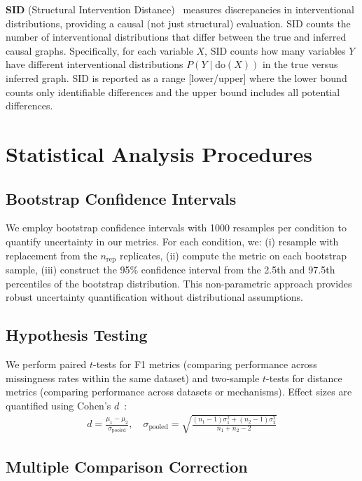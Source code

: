 \documentclass[runningheads]{llncs}
\begin{document}
\textbf{SID} (Structural Intervention Distance)~\cite{peters2015structural} measures discrepancies in interventional distributions, providing a causal (not just structural) evaluation. SID counts the number of interventional distributions that differ between the true and inferred causal graphs. Specifically, for each variable $X$, SID counts how many variables $Y$ have different interventional distributions $P(Y \mid \text{do}(X))$ in the true versus inferred graph. SID is reported as a range [lower/upper] where the lower bound counts only identifiable differences and the upper bound includes all potential differences.

\section{Statistical Analysis Procedures}

\subsection{Bootstrap Confidence Intervals}

We employ bootstrap confidence intervals with 1000 resamples per condition to quantify uncertainty in our metrics. For each condition, we: (i) resample with replacement from the $n_{\text{rep}}$ replicates, (ii) compute the metric on each bootstrap sample, (iii) construct the 95\% confidence interval from the 2.5th and 97.5th percentiles of the bootstrap distribution. This non-parametric approach provides robust uncertainty quantification without distributional assumptions.

\subsection{Hypothesis Testing}

We perform paired $t$-tests for F1 metrics (comparing performance across missingness rates within the same dataset) and two-sample $t$-tests for distance metrics (comparing performance across datasets or mechanisms). Effect sizes are quantified using Cohen's $d$~\cite{cohen2013statistical}:
\begin{align}
d = \frac{\mu_1 - \mu_2}{\sigma_{\text{pooled}}}, \quad \sigma_{\text{pooled}} = \sqrt{\frac{(n_1-1)\sigma_1^2 + (n_2-1)\sigma_2^2}{n_1 + n_2 - 2}}
\end{align}

\subsection{Multiple Comparison Correction}
\end{document}
